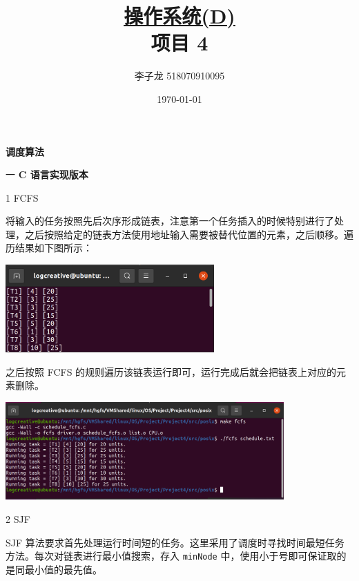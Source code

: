 \documentclass[12pt,a4paper]{article}
\newenvironment{problems}{\begin{list}{}{\renewcommand{\makelabel}[1]{\textbf{##1}\hfil}}}{\end{list}}
\newenvironment{steps}{\begin{list}{}{\renewcommand{\makelabel}[1]{##1.\hfil}}}{\end{list}}
\begin{document}
\title{\normalsize \underline{操作系统(D)}\\\LARGE 项目 4}
\author{李子龙 518070910095}
\date{\today}
\maketitle

\textbf{调度算法}

\begin{problems}
    \item[一] \textbf{C 语言实现版本}
    \begin{steps}
        \item[1] FCFS
        
        

        将输入的任务按照先后次序形成链表，注意第一个任务插入的时候特别进行了处理，之后按照给定的链表方法使用地址输入需要被替代位置的元素，之后顺移。遍历结果如下图所示：
        
        \includegraphics[width=0.6\textwidth]{traverse.png}

        之后按照 FCFS 的规则遍历该链表运行即可，运行完成后就会把链表上对应的元素删除。

        \includegraphics[width=0.8\textwidth]{fcfs.png}
        
        \item[2] SJF
        
        

        SJF 算法要求首先处理运行时间短的任务。这里采用了调度时寻找时间最短任务方法。每次对链表进行最小值搜索，存入 \verb"minNode" 中，使用小于号即可保证取的是同最小值的最先值。


\end{steps}
\end{problems}
\end{document}
